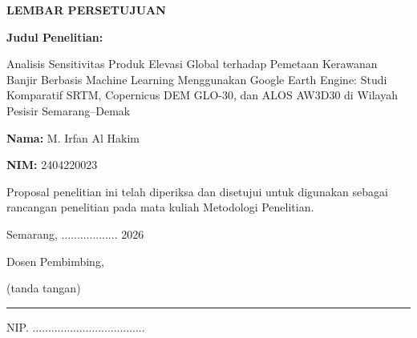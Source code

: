 \documentclass[12pt]{article}
\begin{document}
\begin{titlepage}
\begin{singlespace}
\centering
\vspace*{1cm}
{\large \textbf{LEMBAR PERSETUJUAN}}\par
\vspace{1.5em}

\begin{minipage}{\textwidth}
\textbf{Judul Penelitian:}\par
\smallskip
Analisis Sensitivitas Produk Elevasi Global terhadap Pemetaan Kerawanan Banjir Berbasis Machine Learning Menggunakan Google Earth Engine: Studi Komparatif SRTM, Copernicus DEM GLO-30, dan ALOS AW3D30 di Wilayah Pesisir Semarang--Demak\par
\medskip
\textbf{Nama:} M. Irfan Al Hakim\par
\textbf{NIM:} 2404220023\par
\end{minipage}

\vspace{3em}

\begin{minipage}{0.85\textwidth}
Proposal penelitian ini telah diperiksa dan disetujui untuk digunakan sebagai rancangan penelitian pada mata kuliah Metodologi Penelitian.
\end{minipage}

\vfill

Semarang, .................. 2026\par
\vspace{1em}
Dosen Pembimbing,\par
\vspace{4em}
(tanda tangan)\par
\vspace{1em}
\rule{7cm}{0.4pt}\par
NIP. ....................................\par
\vspace{1.5cm}
\end{singlespace}
\end{titlepage}


\hypersetup{pageanchor=true}
\tableofcontents
\clearpage
{}

\end{document}
